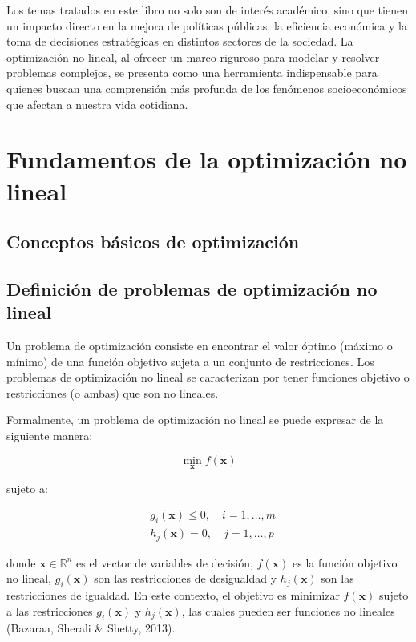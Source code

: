 \begin{flushleft}
	Los temas tratados en este libro no solo son de interés académico, sino que tienen un impacto directo en la mejora de políticas públicas, la eficiencia económica y la toma de decisiones estratégicas en distintos sectores de la sociedad. La optimización no lineal, al ofrecer un marco riguroso para modelar y resolver problemas complejos, se presenta como una herramienta indispensable para quienes buscan una comprensión más profunda de los fenómenos socioeconómicos que afectan a nuestra vida cotidiana.
\end{flushleft}
\section{Fundamentos de la optimización no lineal}
\subsection{Conceptos básicos de optimización}

\subsection{Definición de problemas de optimización no lineal}

\begin{flushleft}
	Un problema de optimización consiste en encontrar el valor óptimo (máximo o mínimo) de una función objetivo sujeta a un conjunto de restricciones. Los problemas de optimización no lineal se caracterizan por tener funciones objetivo o restricciones (o ambas) que son no lineales.
\end{flushleft}

\begin{flushleft}
	Formalmente, un problema de optimización no lineal se puede expresar de la siguiente manera:
\end{flushleft}

$$
\min_{\mathbf{x}} f(\mathbf{x})
$$

sujeto a:

$$
\begin{aligned}
	& g_{i}(\mathbf{x}) \leq 0, \quad i=1, \ldots, m \\
	& h_{j}(\mathbf{x})=0, \quad j=1, \ldots, p
\end{aligned}
$$

\begin{flushleft}
	donde $\mathbf{x} \in \mathbb{R}^{n}$ es el vector de variables de decisión, $f(\mathbf{x})$ es la función objetivo no lineal, $g_{i}(\mathbf{x})$ son las restricciones de desigualdad y $h_{j}(\mathbf{x})$ son las restricciones de igualdad. En este contexto, el objetivo es minimizar $f(\mathbf{x})$ sujeto a las restricciones $g_{i}(\mathbf{x})$ y $h_{j}(\mathbf{x})$, las cuales pueden ser funciones no lineales (Bazaraa, Sherali \& Shetty, 2013).
\end{flushleft}

